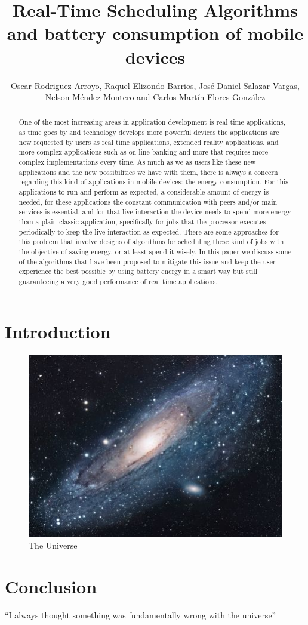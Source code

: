 \documentclass{article}
\title{Real-Time Scheduling Algorithms and battery consumption of mobile devices}
\author{Oscar Rodriguez Arroyo, Raquel Elizondo Barrios, José Daniel Salazar Vargas, Nelson Méndez Montero and Carlos Martín Flores González}
\begin{document}
\maketitle

\section{Introduction}

\begin{abstract}
    One of the most increasing areas in application development is real time applications, as time goes by and technology develops more powerful devices the applications are now requested by users as real time applications, extended reality applications, and more complex applications such as on-line banking and more that requires more complex implementations every time. As much as we as users like these new applications and the new possibilities we have with them, there is always a concern regarding this kind of applications in mobile devices: the energy consumption. For this applications to run and perform as expected, a considerable amount of energy is needed, for these applications the constant communication with peers and/or main services is essential, and for that live interaction the device needs to spend more energy than a plain classic application, specifically for jobs that the processor executes periodically to keep the live interaction as expected. There are some approaches for this problem that involve designs of algorithms for scheduling these kind of jobs with the objective of saving energy, or at least spend it wisely. In this paper we discuss some of the algorithms that have been proposed to mitigate this issue and keep the user experience the best possible by using battery energy in a smart way but still guaranteeing a very good performance of real time applications. 
\end{abstract}

\begin{figure}[h!]
\centering
\includegraphics[scale=1.7]{universe.jpg}
\caption{The Universe}
\label{fig:univerise}
\end{figure}

\section{Conclusion}
``I always thought something was fundamentally wrong with the universe'' \citep{adams1995hitchhiker}



\end{document}

